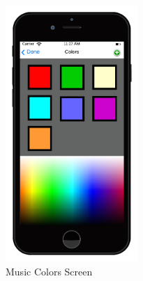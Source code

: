 \documentclass[12pt]{article}
\begin{document}
  \begin{figure}[ht!]
    \centering
    \includegraphics[width=50mm]{iPhone_music_color.png}
    \caption{Music Colors Screen}
    \label{fig:musicColors}
  \end{figure}
  
  
  
  
  
  
  
  
  
  
  
  
  
  
  

  
  
  
  
  
\end{document}
